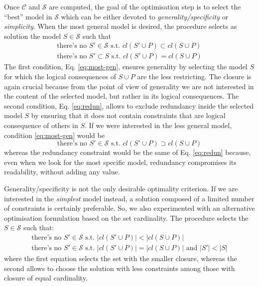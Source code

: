 Once $\mathcal{C}$ and $\mathcal{S}$ are computed, the goal of the optimisation step is to select the ``best'' model in $\mathcal{S}$ which can be either devoted to \emph{generality/specificity} or \emph{simplicity}.
When the most general model is desired, the procedure selects as solution the model $S\in \mathcal{S}$ such that 
\begin{subequations}
  \begin{align}
    \text{there's no $S'\in\mathcal{S}$ s.t. } cl(S'\cup P)\subset cl(S\cup P) \label{eq:most-gen}\\
    \text{there's no $S'\subset S$ s.t. } cl(S'\cup P)=cl(S\cup P)\label{eq:redun}
  \end{align}
\end{subequations}
%
The first condition, Eq. \eqref{eq:most-gen}, ensures generality by selecting the model $S$ for which the logical consequences of $S\cup P$ are the less restricting. The closure is again crucial because from the point of view of generality we are not interested in the content of the selected model, but rather in its logical consequences.
%
The second condition, Eq. \eqref{eq:redun}, allows to exclude redundancy inside the selected model $S$ by ensuring that it does not contain constraints that are logical consequence of others in $S$.
%
If we were interested in the less general model, condition \eqref{eq:most-gen} would be 
\begin{equation}\label{eq:most-spe}
\text{there's no $S'\in\mathcal{S}$ s.t. } cl(S'\cup P)\supset cl(S\cup P)
\end{equation}
whereas the redundancy constraint would be the same of Eq. \eqref{eq:redun} because, even when we look for the most specific model, redundancy compromises its readability, without adding any value.

Generality/specificity is not the only desirable optimality criterion. If we are interested in the \emph{simplest} model instead, a solution composed of a limited number of constraints is certainly preferable. So, we also experimented with an alternative optimisation formulation based on the set cardinality. The procedure selects the $S \in\mathcal{S}$ such that:
\begin{subequations}
   \begin{align}
    \text{there's no $S'\in\mathcal{S}$ s.t. } |cl(S'\cup P)| < |cl(S\cup P)| \label{eq:simpl1}\\
    \text{there's no $S'\in\mathcal{S}$ s.t. } |cl(S'\cup P)|=|cl(S\cup P)| \text{ and } |S'| < |S| \label{eq:simpl2}
   \end{align}
\end{subequations}
where the first equation selects the set with the smaller closure, whereas the second allows to choose the solution with less constraints among those with closure of equal cardinality.

